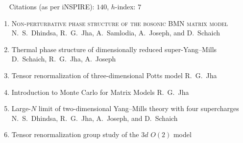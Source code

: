  {\faLeanpub}
~~ Citations (as per iNSPIRE): $140$, $h$-index: $7$
\begin{enumerate}
\item \textsc{Non-perturbative phase structure of the bosonic BMN matrix model}  \newline 
\hfill  \texttt{\textbf{}} \newline 
N.~S.~Dhindsa, R.~G.~Jha, A.~Samlodia, A.~Joseph, and D.~Schaich
\vspace{1mm} 
\item Thermal phase structure of dimensionally reduced super-Yang--Mills \newline 
\texttt{\textbf{}} \newline 
D.~Schaich, R.~G.~Jha, A.~Joseph
\vspace{1mm} 
\item Tensor renormalization of three-dimensional Potts model  \newline 
\texttt{\textbf{}} \newline 
R.~G.~Jha
\vspace{1mm} 
 \item Introduction to Monte Carlo for Matrix Models \newline 
 \texttt{\textbf{}} \newline 
 R.~G.~Jha
 \vspace{1mm} 
 \item Large-$N$ limit of two-dimensional Yang--Mills theory with four supercharges \newline 
 \texttt{\textbf{}} \newline 
 N.~S.~Dhindsa, R.~G.~Jha, A.~Joseph, and D.~Schaich
 \vspace{1mm}  
 \item Tensor renormalization group study of the $3d$ $O(2)$ model \newline 

\end{enumerate}
